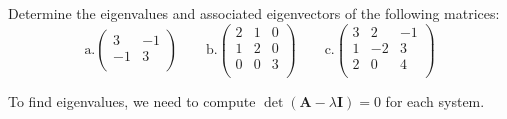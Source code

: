\documentclass[12pts]{exam}
\newcommand{\ve}[1]{\ensuremath{\mathbf{#1}}}
\begin{document}
\begin{questions}
\ifprintanswers
\else
  \vspace*{2 em}
\fi
\addpoints
\question[15] Determine the eigenvalues and associated eigenvectors of the following matrices:
%
\renewcommand{\aaa}{3}
\renewcommand{\aab}{-1}
\renewcommand{\aba}{-1}
\renewcommand{\abb}{3}
\renewcommand{\baa}{2}
\renewcommand{\bab}{1}
\renewcommand{\bac}{0}
\renewcommand{\bba}{1}
\renewcommand{\bbb}{2}
\renewcommand{\bbc}{0}
\renewcommand{\bca}{0}
\renewcommand{\bcb}{0}
\renewcommand{\bcc}{3}
\renewcommand{\caa}{3}
\renewcommand{\cab}{2}
\renewcommand{\cac}{-1}
\renewcommand{\cba}{1}
\renewcommand{\cbb}{-2}
\renewcommand{\cbc}{3}
\renewcommand{\cca}{2}
\renewcommand{\ccb}{0}
\renewcommand{\ccc}{4}
\begin{equation}
\text{a.} \begin{pmatrix}
   \aaa & \aab \\
   \aba & \abb \\
\end{pmatrix} \qquad
%
\text{b.} \begin{pmatrix}
   \baa & \bab & \bac \\
   \bba & \bbb & \bbc \\
   \bca & \bcb & \bcc \\
\end{pmatrix} \qquad
%
\text{c.} \begin{pmatrix}
  \caa & \cab & \cac \\
  \cba & \cbb & \cbc \\
  \cca & \ccb & \ccc \\
\end{pmatrix} \nonumber
\end{equation}

\begin{solution}
To find eigenvalues, we need to compute $\det(\ve{A} - \lambda \ve{I})=0$ for each system.

\end{solution}
\end{questions}
\end{document}
